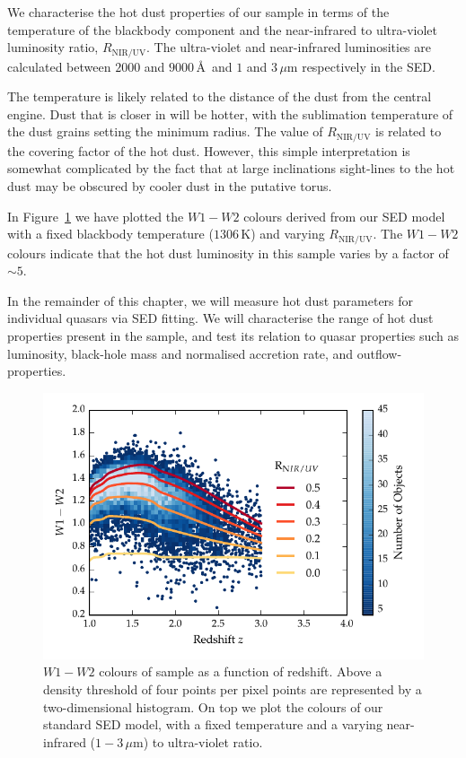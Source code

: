 We characterise the hot dust properties of our sample in terms of the temperature of the blackbody component and the near-infrared to ultra-violet luminosity ratio, $R_{\text{NIR/UV}}$. 
The ultra-violet and near-infrared luminosities are calculated between $2000$ and $9000$\,\AA\, and $1$ and $3$\,$\mu$m respectively in the SED.

The temperature is likely related to the distance of the dust from the central engine.
Dust that is closer in will be hotter, with the sublimation temperature of the dust grains setting the minimum radius.  
The value of $R_{\text{NIR/UV}}$ is related to the covering factor of the hot dust. 
However, this simple interpretation is somewhat complicated by the fact that at large inclinations sight-lines to the hot dust may be obscured by cooler dust in the putative torus. 

In Figure~\ref{fig:w1w2colorsratio} we have plotted the $W1-W2$ colours derived from our SED model with a fixed blackbody temperature ($1306$\,K) and varying $R_{\text{NIR/UV}}$.
The $W1-W2$ colours indicate that the hot dust luminosity in this sample varies by a factor of $\sim5$. 

In the remainder of this chapter, we will measure hot dust parameters for individual quasars via SED fitting. 
We will characterise the range of hot dust properties present in the sample, and test its relation to quasar properties such as luminosity, black-hole mass and normalised accretion rate, and outflow-properties. 

\begin{figure}[t!]
\centering
\includegraphics[width=\columnwidth]{figures/chapter05/w1w2_versus_redshift_ratio.pdf}
\caption[{$W1 - W2$ colours of sample as a function of redshift.}]{$W1 - W2$ colours of sample as a function of redshift. Above a density threshold of four points per pixel points are represented by a two-dimensional histogram. On top we plot the colours of our standard SED model, with a fixed temperature and a varying near-infrared ($1 - 3$\,$\mu$m) to ultra-violet ratio.}
  \label{fig:w1w2colorsratio}
\end{figure}

